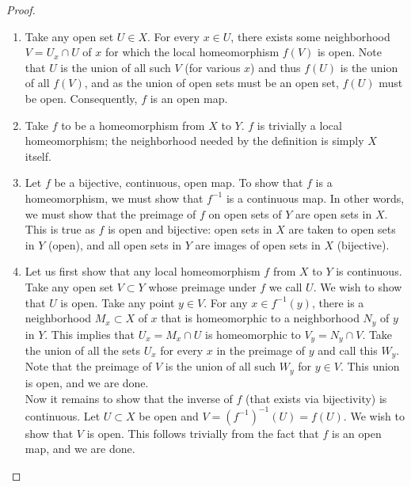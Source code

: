 \documentclass{mathnotes}
\begin{document}
\begin{proof}
    \hspace{1mm} 
    \begin{enumerate}
        \item Take any open set $U\in X$. For every $x\in U$, there exists some neighborhood $V=U_x\cap U$
            of $x$ for which the local homeomorphism $f(V)$ is open. Note that $U$ is the union of all such $V$ (for various $x$)
            and thus $f(U)$ is the union of all $f(V)$, and as the union of open sets must be an open set, $f(U)$ must be open.
            Consequently, $f$ is an open map.
        \item Take $f$ to be a homeomorphism from $X$ to $Y$. $f$ is trivially a local homeomorphism; the neighborhood needed by
            the definition is simply $X$ itself.
        \item Let $f$ be a bijective, continuous, open map. To show that $f$ is a homeomorphism, we must show that $f^{-1}$
            is a continuous map. In other words, we must show that the preimage of $f$ on open sets of $Y$ are open
            sets in $X$. This is true as $f$ is open and bijective: open sets in $X$ are taken to open sets in $Y$ (open), and
            all open sets in $Y$ are images of open sets in $X$ (bijective).
        \item Let us first show that any local homeomorphism $f$ from $X$ to $Y$ is continuous. Take any open set $V\subset Y$
            whose preimage under $f$ we call $U$. We wish to show that $U$ is open. Take any point $y\in V$.
            For any $x\in f^{-1}(y)$, there is a neighborhood $M_x\subset X$ of $x$ that is homeomorphic to a
            neighborhood $N_y$ of $y$ in $Y$.  This implies that $U_x=M_x\cap U$ is homeomorphic to $V_y=N_y\cap V$.
            Take the union of all the sets $U_x$ for every $x$ in the preimage of $y$ and call this $W_y$.
            Note that the preimage of $V$ is the union of all such $W_y$ for $y\in V$. This union is open, and we are done.\\
            Now it remains to show that the inverse of $f$ (that exists via bijectivity) is continuous.
            Let $U\subset X$ be open and $V=(f^{-1})^{-1}(U)=f(U)$.  We wish to show that $V$ is open.
            This follows trivially from the fact that $f$ is an open map, and we are done.
    \end{enumerate}
\end{proof}

\pagebreak
\end{document}
